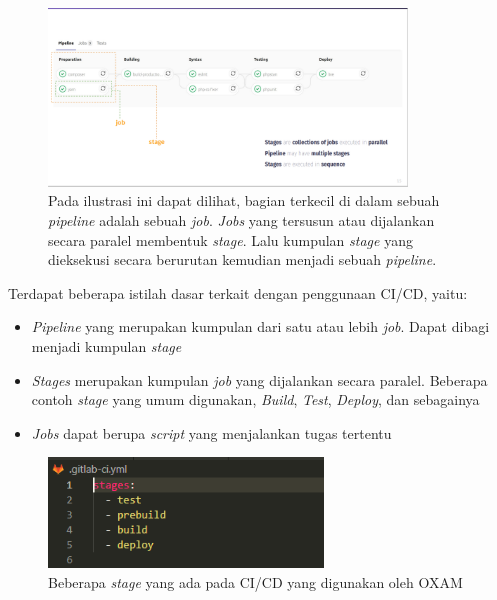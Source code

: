 \documentclass[a4paper,twoside]{article}
\begin{document}
\begin{enumerate}
\begin{itemize}
\begin{itemize}
        		\begin{figure}[H]
                    \centering
                    \includegraphics[width=0.85\textwidth]{images/gitlab-ci-cd.PNG}
                    \caption{Pada ilustrasi ini dapat dilihat, bagian terkecil di dalam sebuah \textit{pipeline} adalah sebuah \textit{job}. \textit{Jobs} yang tersusun atau dijalankan secara paralel membentuk \textit{stage}. Lalu kumpulan \textit{stage} yang dieksekusi secara berurutan kemudian menjadi sebuah \textit{pipeline}.}
                    \label{fig:gitlab-concepts}
                \end{figure}
        		
                 Terdapat beberapa istilah dasar terkait dengan penggunaan CI/CD, yaitu:
                 \begin{itemize}
                     \item \textit{Pipeline} yang merupakan kumpulan dari satu atau lebih \textit{job}. Dapat dibagi menjadi kumpulan \textit{stage}
                     \item \textit{Stages} merupakan kumpulan \textit{job} yang dijalankan secara paralel. Beberapa contoh \textit{stage} yang umum digunakan, \textit{Build}, \textit{Test}, \textit{Deploy}, dan sebagainya
                     \item \textit{Jobs} dapat berupa \textit{script} yang menjalankan tugas tertentu
                 \end{itemize}
                 
                 \begin{figure}[H]
                    \centering
                    \includegraphics[width=0.65\textwidth]{images/gitlab-stages.PNG}
                    \caption{Beberapa \textit{stage} yang ada pada CI/CD yang digunakan oleh OXAM}
                    \label{fig:gitlab-stages}
                \end{figure}
        		

\end{itemize}
\end{itemize}
\end{enumerate}
\end{document}
